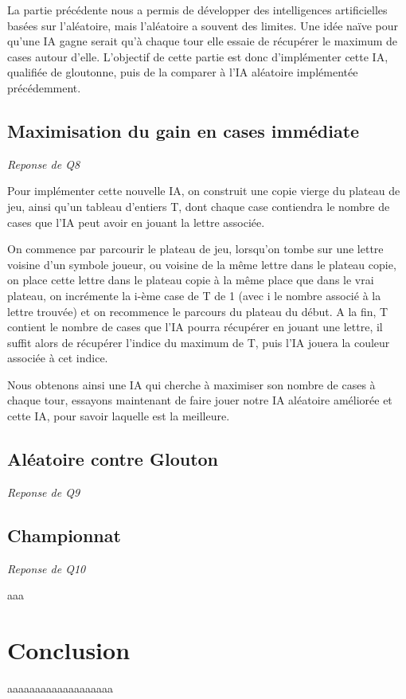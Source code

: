 \documentclass[a4paper,11pt]{article}
\begin{document}
La partie précédente nous a permis de développer des intelligences artificielles
basées sur l'aléatoire, mais l'aléatoire a souvent des limites. Une idée naïve pour
qu'une IA gagne serait qu'à chaque tour elle essaie de récupérer le maximum de cases
autour d'elle. L'objectif de cette partie est donc d'implémenter cette IA, qualifiée 
de gloutonne, puis de la comparer à l'IA aléatoire implémentée précédemment.


\subsection{Maximisation du gain en cases immédiate}
\emph{Reponse de Q8}

Pour implémenter cette nouvelle IA, on construit une copie vierge du plateau de jeu,
ainsi qu'un tableau d'entiers T, dont chaque case contiendra le nombre de cases que l'IA peut
avoir en jouant la lettre associée. 

On commence par parcourir le plateau de jeu, lorsqu'on tombe sur une lettre voisine
d'un symbole joueur, ou voisine de la même lettre dans le plateau copie, on place cette
lettre dans le plateau copie à la même place que dans le vrai plateau, on incrémente
la i-ème case de T de 1 (avec i le nombre associé à la lettre trouvée) et on 
recommence le parcours du plateau du début. A la fin, T contient le nombre de cases
que l'IA pourra récupérer en jouant une lettre, il suffit alors de récupérer l'indice
du maximum de T, puis l'IA jouera la couleur associée à cet indice. 

Nous obtenons ainsi une IA qui cherche à maximiser son nombre de cases à chaque tour,
essayons maintenant de faire jouer notre IA aléatoire améliorée et cette IA, pour
savoir laquelle est la meilleure.

\subsection{Aléatoire contre Glouton}
\emph{Reponse de Q9}



\subsection{Championnat}
\emph{Reponse de Q10}

aaa

\section{Conclusion}

aaaaaaaaaaaaaaaaaaa
\end{document}
